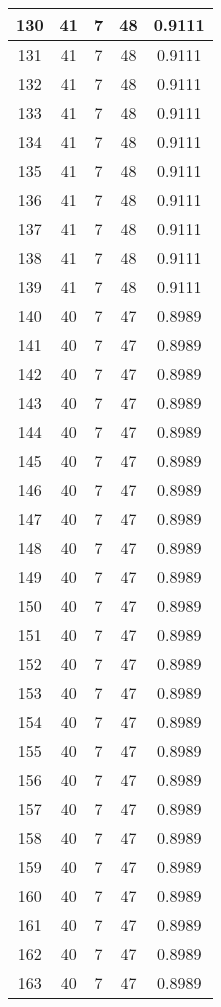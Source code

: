 \documentclass[letterpaper, 12pt]{article}
\begin{document}
\begin{longtable}{|c|c|c|c|c|}
\hline
130 & 41 & 7 & 48 & 0.9111 \\
\hline
131 & 41 & 7 & 48 & 0.9111 \\
\hline
132 & 41 & 7 & 48 & 0.9111 \\
\hline
133 & 41 & 7 & 48 & 0.9111 \\
\hline
134 & 41 & 7 & 48 & 0.9111 \\
\hline
135 & 41 & 7 & 48 & 0.9111 \\
\hline
136 & 41 & 7 & 48 & 0.9111 \\
\hline
137 & 41 & 7 & 48 & 0.9111 \\
\hline
138 & 41 & 7 & 48 & 0.9111 \\
\hline
139 & 41 & 7 & 48 & 0.9111 \\
\hline
140 & 40 & 7 & 47 & 0.8989 \\
\hline
141 & 40 & 7 & 47 & 0.8989 \\
\hline
142 & 40 & 7 & 47 & 0.8989 \\
\hline
143 & 40 & 7 & 47 & 0.8989 \\
\hline
144 & 40 & 7 & 47 & 0.8989 \\
\hline
145 & 40 & 7 & 47 & 0.8989 \\
\hline
146 & 40 & 7 & 47 & 0.8989 \\
\hline
147 & 40 & 7 & 47 & 0.8989 \\
\hline
148 & 40 & 7 & 47 & 0.8989 \\
\hline
149 & 40 & 7 & 47 & 0.8989 \\
\hline
150 & 40 & 7 & 47 & 0.8989 \\
\hline
151 & 40 & 7 & 47 & 0.8989 \\
\hline
152 & 40 & 7 & 47 & 0.8989 \\
\hline
153 & 40 & 7 & 47 & 0.8989 \\
\hline
154 & 40 & 7 & 47 & 0.8989 \\
\hline
155 & 40 & 7 & 47 & 0.8989 \\
\hline
156 & 40 & 7 & 47 & 0.8989 \\
\hline
157 & 40 & 7 & 47 & 0.8989 \\
\hline
158 & 40 & 7 & 47 & 0.8989 \\
\hline
159 & 40 & 7 & 47 & 0.8989 \\
\hline
160 & 40 & 7 & 47 & 0.8989 \\
\hline
161 & 40 & 7 & 47 & 0.8989 \\
\hline
162 & 40 & 7 & 47 & 0.8989 \\
\hline
163 & 40 & 7 & 47 & 0.8989 \\

\end{longtable}
\end{document}
